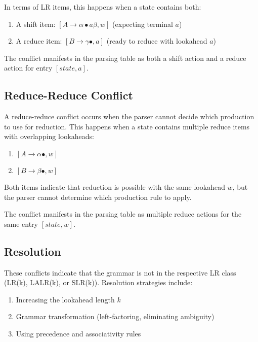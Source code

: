 In terms of LR items, this happens when a state contains both:
\begin{enumerate}
    \item A shift item: $[A \to \alpha \bullet a \beta, w]$ (expecting terminal $a$)
    \item A reduce item: $[B \to \gamma \bullet, a]$ (ready to reduce with lookahead $a$)
\end{enumerate}

The conflict manifests in the parsing table as both a shift action and a reduce action for entry $[state, a]$.

\subsection{Reduce-Reduce Conflict}

A reduce-reduce conflict occurs when the parser cannot decide which production to use for reduction. This happens when a state contains multiple reduce items with overlapping lookaheads:
\begin{enumerate}
    \item $[A \to \alpha \bullet, w]$
    \item $[B \to \beta \bullet, w]$
\end{enumerate}

Both items indicate that reduction is possible with the same lookahead $w$, but the parser cannot determine which production rule to apply.

The conflict manifests in the parsing table as multiple reduce actions for the same entry $[state, w]$.

\subsection{Resolution}

These conflicts indicate that the grammar is not in the respective LR class (LR(k), LALR(k), or SLR(k)). Resolution strategies include:
\begin{enumerate}
    \item Increasing the lookahead length $k$
    \item Grammar transformation (left-factoring, eliminating ambiguity)
    \item Using precedence and associativity rules
\end{enumerate}
